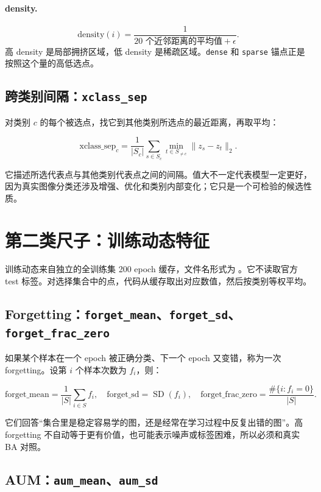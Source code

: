 \documentclass[UTF8,a4paper,12pt]{ctexart}
\newcommand{\code}[1]{\texttt{#1}}
\begin{document}
\paragraph{density.}
\[
\text{density}(i)=\frac{1}{\text{20 个近邻距离的平均值}+\epsilon}.
\]
高 density 是局部拥挤区域，低 density 是稀疏区域。\code{dense} 和 \code{sparse} 锚点正是按照这个量的高低选点。

\subsection{跨类别间隔：\code{xclass\_sep}}

对类别 \(c\) 的每个被选点，找它到其他类别所选点的最近距离，再取平均：

\[
\text{xclass\_sep}_c=
\frac{1}{|S_c|}\sum_{s\in S_c}
\min_{t\in S_{\ne c}}\lVert z_s-z_t\rVert_2.
\]

它描述所选代表点与其他类别代表点之间的间隔。值大不一定代表模型一定更好，因为真实图像分类还涉及增强、优化和类别内部变化；它只是一个可检验的候选性质。

\section{第二类尺子：训练动态特征}

训练动态来自独立的全训练集 200 epoch 缓存，文件名形式为
。它不读取官方 test 标签。对选择集合中的点，代码从缓存取出对应数值，然后按类别等权平均。

\subsection{Forgetting：\code{forget\_mean}、\code{forget\_sd}、\code{forget\_frac\_zero}}

如果某个样本在一个 epoch 被正确分类、下一个 epoch 又变错，称为一次 forgetting。设第 \(i\) 个样本次数为 \(f_i\)，则：

\[
\text{forget\_mean}=\frac{1}{|S|}\sum_{i\in S}f_i,
\quad
\text{forget\_sd}=\operatorname{SD}(f_i),
\quad
\text{forget\_frac\_zero}=\frac{\#\{i:f_i=0\}}{|S|}.
\]

它们回答“集合里是稳定容易学的图，还是经常在学习过程中反复出错的图”。高 forgetting 不自动等于更有价值，也可能表示噪声或标签困难，所以必须和真实 BA 对照。

\subsection{AUM：\code{aum\_mean}、\code{aum\_sd}}
\end{document}

